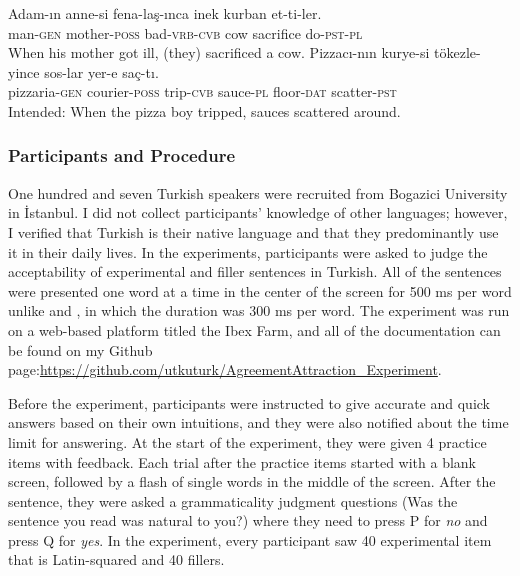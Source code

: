 \documentclass[doc]{apa6}
\begin{document}
\begin{exe}
\ex
\begin{xlist}
\ex \label{fillera}
\gll Adam-{\i}n anne-si fena-la\c{s}-{\i}nca inek kurban et-ti-ler.\\
man-\textsc{gen} mother-\textsc{poss} bad-\textsc{vrb}-\textsc{cvb} cow sacrifice do-\textsc{pst}-\textsc{pl}\\
\glt When his mother got ill, (they) sacrificed a cow.
\ex \label{fillerb}
\gll *Pizzac{\i}-n{\i}n kurye-si t\"{o}kezle-yince sos-lar yer-e sa\c{c}-t{\i}.\\
pizzaria-\textsc{gen} courier-\textsc{poss} trip-\textsc{cvb} sauce-\textsc{pl} floor-\textsc{dat} scatter-\textsc{pst}\\
\glt Intended: When the pizza boy tripped, sauces scattered around. 
\end{xlist}
\end{exe}

\hypertarget{participants-and-procedure}{%
\subsubsection{Participants and Procedure}\label{participants-and-procedure}}

One hundred and seven Turkish speakers were recruited from Bogazici University in İstanbul. I did not collect participants' knowledge of other languages; however, I verified that Turkish is their native language and that they predominantly use it in their daily lives. In the experiments, participants were asked to judge the acceptability of experimental and filler sentences in Turkish. All of the sentences were presented one word at a time in the center of the screen for 500 ms per word unlike \textcite{Lago2018} and \textcite{Wagers2009}, in which the duration was 300 ms per word. The experiment was run on a web-based platform titled the Ibex Farm, and all of the documentation can be found on my Github page:\url{https://github.com/utkuturk/AgreementAttraction_Experiment}.

Before the experiment, participants were instructed to give accurate and quick answers based on their own intuitions, and they were also notified about the time limit for answering. At the start of the experiment, they were given 4 practice items with feedback. Each trial after the practice items started with a blank screen, followed by a flash of single words in the middle of the screen. After the sentence, they were asked a grammaticality judgment questions (Was the sentence you read was natural to you?) where they need to press P for \emph{no} and press Q for \emph{yes}. In the experiment, every participant saw 40 experimental item that is Latin-squared and 40 fillers.
\end{document}
